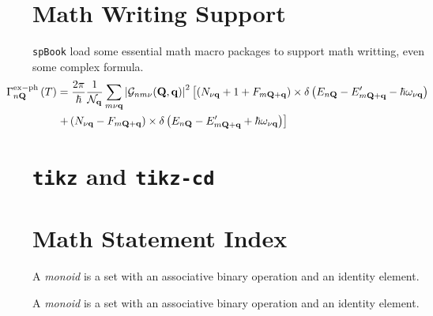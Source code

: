 
    \section{Math Writing Support}
        \texttt{spBook} load some essential math macro packages to support math writting, even some complex formula.
        \begin{align}
            \hspace{-25pt}\Gamma_{n\mathbf{Q}}^{\mathrm{ex-ph}}\left(T\right)&=\frac{2\pi}{\hbar}\frac{1}{\mathcal{N}_\mathbf{q}}\sum_{m\nu\mathbf{q}}\left|\mathcal{G}_{nm\nu}(\mathbf{Q},\mathbf{q})\right|^2\left[\left(N_{\nu\mathbf{q}}+1+F_{m\mathbf{Q}+\mathbf{q}}\right)\times\delta\left(E_{n\mathbf{Q}}-E^\prime_{m\mathbf{Q}+\mathbf{q}}-\hbar\omega_{\nu\mathbf{q}}\right)\right.\nonumber
            \\
            &\left.+\left(N_{\nu\mathbf{q}}-F_{m\mathbf{Q}+\mathbf{q}}\right)\times\delta\left(E_{n\mathbf{Q}}-E^\prime_{m\mathbf{Q}+\mathbf{q}}+\hbar\omega_{\nu\mathbf{q}}\right)\right]
        \end{align}

    \section{\texttt{tikz} and \texttt{tikz-cd}}
        

    \section{Math Statement Index}
        \begin{definition}[Monoid]
            A \emph{monoid} is a set with an associative binary operation and an identity element.
        \end{definition}
        \begin{theorem}[Schur]
            A \emph{monoid} is a set with an associative binary operation and an identity element.
        \end{theorem}